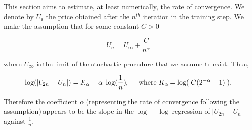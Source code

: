 \documentclass{article}
\numberwithin{equation}{section}
\begin{document}
This section aims to estimate, at least numerically, the rate of convergence.  We denote by $U_n$ the price obtained after the $n^{th}$ iteration in the training step. We make the assumption that for some constant $C > 0$

$$U_n = U_{\infty} + \frac{C}{n^{\alpha}}$$

\noindent
where $U_{\infty}$ is the limit of the stochastic procedure that we assume to exist. Thus,

$$\log(|U_{2n} - U_{n}|) = K_{\alpha} + \alpha \hspace{0.1cm} \log(\frac{1}{n}), \hspace{0.5cm} \text{where} \hspace{0.1cm} K_{\alpha} = \log(|C(2^{-\alpha} - 1)|).$$

\noindent
Therefore the coefficient $\alpha$ (representing the rate of convergence following the assumption) appears to be the slope in the $\log - \log$ regression of $|U_{2n} - U_{n}|$ against $\frac{1}{n}$.
\end{document}
